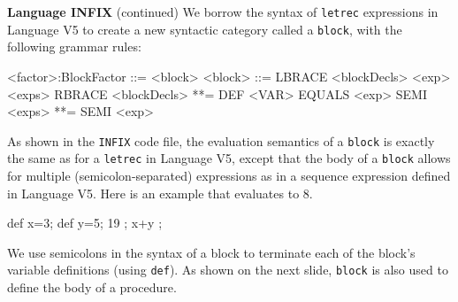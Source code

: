 \begin{minipage}[t]{\sw}
\slidenumber
\LARGE
{\bf Language INFIX} (continued)\exx
We borrow the syntax of \verb'letrec' expressions in Language V5
to create a new syntactic category called a \verb'block',
with the following grammar rules:
{\Large
\begin{qv}
<factor>:BlockFactor ::= <block>
<block>              ::= LBRACE <blockDecls> <exp> <exps> RBRACE
<blockDecls>         **= DEF <VAR> EQUALS <exp> SEMI
<exps>               **= SEMI <exp>
\end{qv}
}
As shown in the \verb'INFIX' code file,
the evaluation semantics of a \verb'block' is
exactly the same as for a \verb'letrec' in Language V5,
except that the body of a \verb'block' allows 
for multiple (semicolon-separated) expressions 
as in a sequence expression defined in Language V5.
Here is an example that evaluates to 8.
{\Large
\begin{qv}
{
  def x=3;
  def y=5;
  19 ; x+y %
};
\end{qv}
}
We use semicolons in the syntax of a block to terminate
each of the block's variable definitions (using \verb'def').
As shown on the next slide,
\verb'block' is also used to define the body of a procedure.
\end{minipage}
